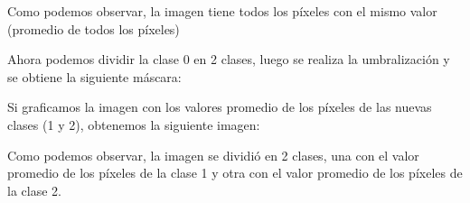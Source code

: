 \newpage

Como podemos observar, la imagen tiene todos los píxeles con el mismo valor (promedio de todos los píxeles)

Ahora podemos dividir la clase 0 en 2 clases, luego se realiza la umbralización y se obtiene la siguiente máscara:

Si graficamos la imagen con los valores promedio de los píxeles de las nuevas clases (1 y 2), obtenemos la siguiente imagen:

Como podemos observar, la imagen se dividió en 2 clases, una con el valor promedio de los píxeles de la clase 1 y otra con el valor promedio de los píxeles de la clase 2.
